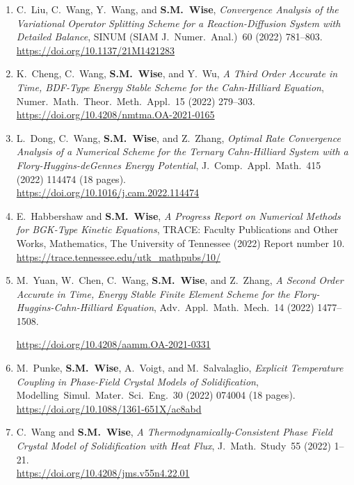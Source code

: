 \documentclass[11pt]{letter}
\begin{document}
\begin{enumerate}
	\item
C.~Liu, C.~Wang, Y.~Wang, and \textbf{S.M.~Wise}, {\sl Convergence Analysis of the Variational Operator Splitting Scheme for a Reaction-Diffusion System with Detailed Balance}, SINUM (SIAM J.~Numer.~Anal.)~60 (2022) 781--803.
	\\
\url{https://doi.org/10.1137/21M1421283}

	\item
K.~Cheng, C.~Wang, \textbf{S.M.~Wise}, and Y.~Wu, {\sl A Third Order Accurate in Time, BDF-Type Energy Stable Scheme for the Cahn-Hilliard Equation}, Numer.~Math.~Theor.~Meth.~Appl.~15 (2022) 279--303.
	\\
\url{https://doi.org/10.4208/nmtma.OA-2021-0165}

	\item
L.~Dong, C.~Wang, \textbf{S.M.~Wise}, and Z.~Zhang, {\sl Optimal Rate Convergence Analysis of a Numerical Scheme for the Ternary Cahn-Hilliard System with a Flory-Huggins-deGennes Energy Potential}, J.~Comp.~Appl.~Math.~415 (2022) 114474 (18 pages).
	\\
\url{https://doi.org/10.1016/j.cam.2022.114474}

	\item
E.~Habbershaw and \textbf{S.M.~Wise}, {\sl A Progress Report on Numerical Methods for BGK-Type Kinetic Equations}, TRACE: Faculty Publications and Other Works, Mathematics, The University of Tennessee (2022) Report number 10.
 	\\
\url{https://trace.tennessee.edu/utk_mathpubs/10/}

	\item
M.~Yuan, W.~Chen, C.~Wang, \textbf{S.M.~Wise}, and Z.~Zhang, {\sl A Second Order Accurate in Time, Energy Stable Finite Element Scheme for the Flory-Huggins-Cahn-Hilliard Equation}, Adv.~Appl.~Math.~Mech.~14 (2022) 1477--1508.

\url{https://doi.org/10.4208/aamm.OA-2021-0331}

	\item
M.~Punke, \textbf{S.M.~Wise}, A.~Voigt, and M.~Salvalaglio, {\sl  Explicit Temperature Coupling in Phase-Field Crystal Models of Solidification}, Modelling~Simul.~Mater.~Sci.~Eng.~30 (2022) 074004 (18 pages).
	\\ 
\url{https://doi.org/10.1088/1361-651X/ac8abd}

	\item
C.~Wang  and \textbf{S.M.~Wise}, {\sl A Thermodynamically-Consistent Phase Field Crystal Model of Solidification with Heat Flux}, J.~Math.~Study~55 (2022) 1--21.
	\\
\url{https://doi.org/10.4208/jms.v55n4.22.01}


\end{enumerate}
\end{document}
